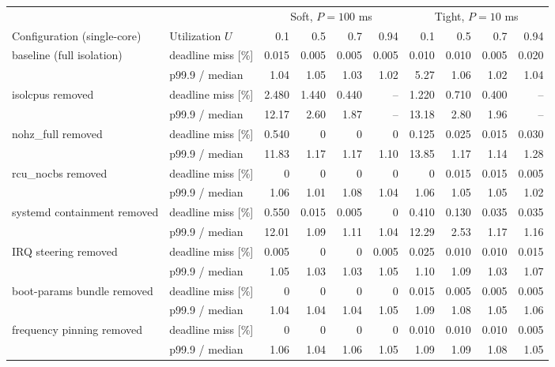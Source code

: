 \begin{tabular}{l|l|rrrr|rrrr}
\toprule
 &  & \multicolumn{4}{c}{Soft, $P = 100$ ms} & \multicolumn{4}{c}{Tight, $P = 10$ ms} \\
Configuration (single-core) & Utilization $U$ & 0.1 & 0.5 & 0.7 & 0.94 & 0.1 & 0.5 & 0.7 & 0.94 \\
\midrule
\multirow[t]{2}{*}{baseline (full isolation)} & deadline miss [\%] & 0.015 & 0.005 & 0.005 & 0.005 & 0.010 & 0.010 & 0.005 & 0.020 \\
 & p99.9 / median & 1.04 & 1.05 & 1.03 & 1.02 & 5.27 & 1.06 & 1.02 & 1.04 \\
\cmidrule{1-10}
\multirow[t]{2}{*}{isolcpus removed} & deadline miss [\%] & 2.480 & 1.440 & 0.440 & -- & 1.220 & 0.710 & 0.400 & -- \\
 & p99.9 / median & 12.17 & 2.60 & 1.87 & -- & 13.18 & 2.80 & 1.96 & -- \\
\cmidrule{1-10}
\multirow[t]{2}{*}{nohz_full removed} & deadline miss [\%] & 0.540 & 0 & 0 & 0 & 0.125 & 0.025 & 0.015 & 0.030 \\
 & p99.9 / median & 11.83 & 1.17 & 1.17 & 1.10 & 13.85 & 1.17 & 1.14 & 1.28 \\
\cmidrule{1-10}
\multirow[t]{2}{*}{rcu_nocbs removed} & deadline miss [\%] & 0 & 0 & 0 & 0 & 0 & 0.015 & 0.015 & 0.005 \\
 & p99.9 / median & 1.06 & 1.01 & 1.08 & 1.04 & 1.06 & 1.05 & 1.05 & 1.02 \\
\cmidrule{1-10}
\multirow[t]{2}{*}{systemd containment removed} & deadline miss [\%] & 0.550 & 0.015 & 0.005 & 0 & 0.410 & 0.130 & 0.035 & 0.035 \\
 & p99.9 / median & 12.01 & 1.09 & 1.11 & 1.04 & 12.29 & 2.53 & 1.17 & 1.16 \\
\cmidrule{1-10}
\multirow[t]{2}{*}{IRQ steering removed} & deadline miss [\%] & 0.005 & 0 & 0 & 0.005 & 0.025 & 0.010 & 0.010 & 0.015 \\
 & p99.9 / median & 1.05 & 1.03 & 1.03 & 1.05 & 1.10 & 1.09 & 1.03 & 1.07 \\
\cmidrule{1-10}
\multirow[t]{2}{*}{boot-params bundle removed} & deadline miss [\%] & 0 & 0 & 0 & 0 & 0.015 & 0.005 & 0.005 & 0.005 \\
 & p99.9 / median & 1.04 & 1.04 & 1.04 & 1.05 & 1.09 & 1.08 & 1.05 & 1.06 \\
\cmidrule{1-10}
\multirow[t]{2}{*}{frequency pinning removed} & deadline miss [\%] & 0 & 0 & 0 & 0 & 0.010 & 0.010 & 0.010 & 0.005 \\
 & p99.9 / median & 1.06 & 1.04 & 1.06 & 1.05 & 1.09 & 1.09 & 1.08 & 1.05 \\
\bottomrule
\end{tabular}
